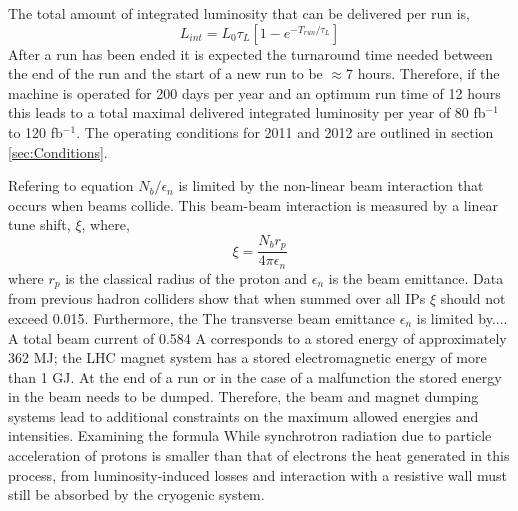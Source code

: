 The total amount of integrated luminosity that can be delivered
per run is,
\begin{equation}
L_{int}=L_{0}\tau_{L}\left[ 1-e^{-T_{run}/\tau_{L}}\right]
\end{equation}
After a run has been ended it is expected the turnaround time
needed between the end of the run and the start of a new run
to be $\approx$7 hours. Therefore, if the machine is operated for 200 days
per year and an optimum run time of 12 hours this leads to a 
total maximal delivered integrated luminosity per year of 80 fb$^{-1}$
to 120 fb$^{-1}$. The operating conditions for 2011 and 2012
are outlined in section \ref{sec:Conditions}.

Refering to equation %
$N_{b}/\epsilon_{n}$ is limited by the %
non-linear beam interaction that occurs when beams collide. This
beam-beam interaction is measured by a linear tune shift, $\xi$, where,
\begin{equation}
\xi=\frac{N_{b}r_{p}}{4\pi\epsilon_{n}}
\end{equation}
where $r_{p}$ is the classical radius of the proton
and $\epsilon_{n}$ is the beam emittance.
Data from previous hadron colliders show that when summed over
all IPs $\xi$ should not exceed 0.015. %
Furthermore, the %
The transverse beam emittance $\epsilon_{n}$ is limited by.... 
A total beam current of 0.584 A corresponds to a stored energy
of approximately 362 MJ; the LHC magnet system has a stored
electromagnetic energy of more than 1 GJ.
At the end of a run or in the case of a malfunction the stored
energy in the beam needs to be dumped. Therefore, the beam
and magnet dumping systems lead to additional constraints
on the maximum allowed energies and intensities.
Examining the formula
While synchrotron radiation due to particle acceleration of protons%
is smaller than that of electrons the heat generated in this process,
 from luminosity-induced losses and interaction with a resistive wall
must still be absorbed by the cryogenic system. 

